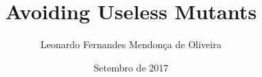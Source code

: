 \documentclass[en, qual]{ufpethesis}
\institute{Centro de Informática - CIn}
\title{Avoiding Useless Mutants}
\date{Setembro de 2017}
\author{Leonardo Fernandes Mendonça de Oliveira}
\begin{document}
\frontmatter

\frontpage

\presentationpage







\abstract

 

\tableofcontents

\listoffigures

\listoftables

%

\mainmatter









% 

\backmatter

\appendix

% 






\colophon
\end{document}
